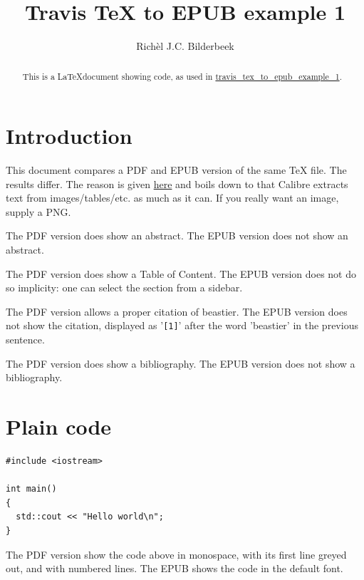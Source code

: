 \documentclass[ebook]{memoir}
\title{Travis TeX to EPUB example 1}
\author{Rich\`el J.C. Bilderbeek}
\begin{document}
\maketitle

\tableofcontents

\begin{abstract}

This is a \LaTeX document showing code, as used in \href{https://github.com/richelbilderbeek/travis_tex_to_epub_example_1}{travis\_tex\_to\_epub\_example\_1}.

\end{abstract}

\section{Introduction}

This document compares a PDF and EPUB version of the same TeX file.
The results differ. The reason is given \href{https://ebooks.stackexchange.com/questions/6632/calibre-viewer-displays-books-wrong}{here}
and boils down to that Calibre extracts text from images/tables/etc. as much as it can.
If you really want an image, supply a PNG.

The PDF version does show an abstract. 
The EPUB version does not show an abstract.

The PDF version does show a Table of Content. 
The EPUB version does not do so implicity: one can select the section from a sidebar.

The PDF version allows a proper citation of beastier\cite{beastier}.
The EPUB version does not show the citation, displayed as '\verb;[1];' after the word 'beastier' in the previous sentence.

The PDF version does show a bibliography. 
The EPUB version does not show a bibliography.

\section{Plain code}

\begin{lstlisting}
#include <iostream>

int main()
{
  std::cout << "Hello world\n";
}
\end{lstlisting}

The PDF version show the code above in monospace, with its first line greyed out, and with numbered lines.
The EPUB shows the code in the default font.
\end{document}
